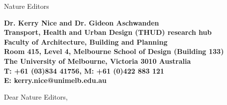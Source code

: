 \documentclass[11pt]{letter} %
\begin{document}

\begin{letter}{Nature Editors
} 





\begin{center}
\large\bf Dr. Kerry Nice and Dr. Gideon Aschwanden \\ %
Transport, Health and Urban Design (THUD) research hub \\
Faculty of Architecture, Building and Planning  \\
Room 415, Level 4, Melbourne School of Design (Building 133) \\
The University of Melbourne, Victoria 3010 Australia \\
T: +61 (03)834 41756, M: +61 (0)422 883 121 \\
E: kerry.nice@unimelb.edu.au %
\end{center} 
\vfill

\signature{Kerry Nice and Gideon Aschwanden} %


\opening{Dear Nature Editors,} 
 

\end{letter}
\end{document}
